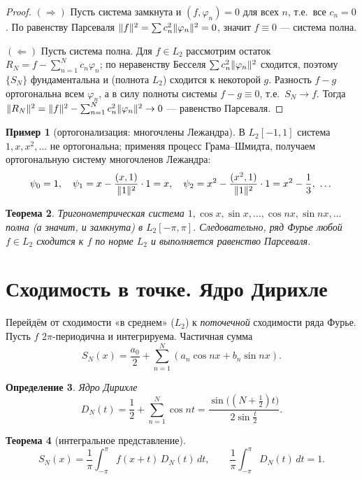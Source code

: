 \documentclass[11pt,a4paper]{article}
\theoremstyle{definition}
\newtheorem{definition}{Определение}[section]
\newtheorem{example}[definition]{Пример}
\theoremstyle{plain}
\newtheorem{theorem}[definition]{Теорема}
\newcommand{\dt}{\,dt}
\DeclarePairedDelimiter{\norm}{\lVert}{\rVert}
\begin{document}
\begin{proof}
$(\Rightarrow)$ Пусть система замкнута и $(f,\varphi_n)=0$ для всех $n$, т.е.\ все $c_n=0$. По
равенству Парсеваля $\norm{f}^2=\sum c_n^2\norm{\varphi_n}^2=0$, значит $f\equiv0$ — система полна.

$(\Leftarrow)$ Пусть система полна. Для $f\in L_2$ рассмотрим остаток
$R_N=f-\sum_{n=1}^N c_n\varphi_n$; по неравенству Бесселя $\sum c_n^2\norm{\varphi_n}^2$ сходится,
поэтому $\{S_N\}$ фундаментальна и (полнота $L_2$) сходится к некоторой $g$. Разность $f-g$
ортогональна всем $\varphi_n$, а в силу полноты системы $f-g\equiv0$, т.е.\ $S_N\to f$. Тогда
$\norm{R_N}^2=\norm{f}^2-\sum_{n=1}^N c_n^2\norm{\varphi_n}^2\to0$ — равенство Парсеваля.
\end{proof}

\begin{example}[ортогонализация: многочлены Лежандра]
В $L_2[-1,1]$ система $1,x,x^2,\dots$ не ортогональна; применяя процесс Грама--Шмидта, получаем
ортогональную систему многочленов Лежандра:
\[
  \psi_0=1,\quad \psi_1=x-\frac{(x,1)}{\norm1^2}\cdot1=x,\quad
  \psi_2=x^2-\frac{(x^2,1)}{\norm1^2}\cdot1=x^2-\frac13,\ \dots
\]
\end{example}

\begin{theorem}
Тригонометрическая система $1,\cos x,\sin x,\dots,\cos nx,\sin nx,\dots$ полна (а значит, и
замкнута) в $L_2[-\pi,\pi]$. Следовательно, ряд Фурье любой $f\in L_2$ сходится к $f$ по норме
$L_2$ и выполняется равенство Парсеваля.
\end{theorem}

\section{Сходимость в точке. Ядро Дирихле}

Перейдём от сходимости «в среднем» ($L_2$) к \emph{поточечной} сходимости ряда Фурье. Пусть $f$
$2\pi$-периодична и интегрируема. Частичная сумма
\[
  S_N(x)=\frac{a_0}{2}+\sum_{n=1}^N(a_n\cos nx+b_n\sin nx).
\]

\begin{definition}
\emph{Ядро Дирихле}
\[
  D_N(t)=\frac12+\sum_{n=1}^N\cos nt=\frac{\sin\bigl((N+\tfrac12)t\bigr)}{2\sin\tfrac t2}.
\]
\end{definition}

\begin{theorem}[интегральное представление]
\[
  S_N(x)=\frac1\pi\int_{-\pi}^{\pi}f(x+t)\,D_N(t)\dt,\qquad
  \frac1\pi\int_{-\pi}^{\pi}D_N(t)\dt=1 .
\]
\end{theorem}
\end{document}
